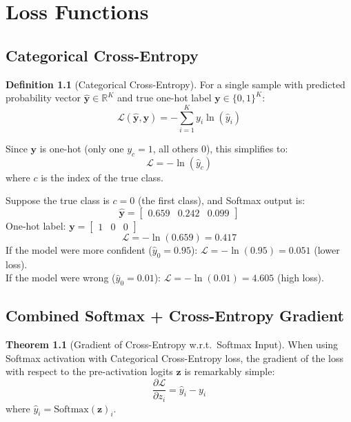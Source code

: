 \documentclass[12pt, a4paper]{report}
\theoremstyle{definition}
\newtheorem{definition}{Definition}[chapter]
\newtheorem{theorem}{Theorem}[chapter]
\begin{document}
\chapter{Loss Functions}

\section{Categorical Cross-Entropy}

\begin{definition}[Categorical Cross-Entropy]
For a single sample with predicted probability vector $\hat{\mathbf{y}} \in \mathbb{R}^K$ and true one-hot label $\mathbf{y} \in \{0,1\}^K$:
\begin{equation}
    \mathcal{L}(\hat{\mathbf{y}}, \mathbf{y}) = -\sum_{i=1}^{K} y_i \ln(\hat{y}_i)
\end{equation}

Since $\mathbf{y}$ is one-hot (only one $y_c = 1$, all others $0$), this simplifies to:
\begin{equation}
    \mathcal{L} = -\ln(\hat{y}_c)
\end{equation}
where $c$ is the index of the true class.
\end{definition}

\begin{numexample}
Suppose the true class is $c = 0$ (the first class), and Softmax output is:
\[
\hat{\mathbf{y}} = \begin{bmatrix} 0.659 & 0.242 & 0.099 \end{bmatrix}
\]
One-hot label: $\mathbf{y} = \begin{bmatrix} 1 & 0 & 0 \end{bmatrix}$
\[
\mathcal{L} = -\ln(0.659) = \boxed{0.417}
\]
If the model were more confident ($\hat{y}_0 = 0.95$): $\mathcal{L} = -\ln(0.95) = 0.051$ (lower loss).\\
If the model were wrong ($\hat{y}_0 = 0.01$): $\mathcal{L} = -\ln(0.01) = 4.605$ (high loss).
\end{numexample}

\section{Combined Softmax + Cross-Entropy Gradient}

\begin{theorem}[Gradient of Cross-Entropy w.r.t.\ Softmax Input]
When using Softmax activation with Categorical Cross-Entropy loss, the gradient of the loss with respect to the pre-activation logits $\mathbf{z}$ is remarkably simple:
\begin{equation}
    \frac{\partial \mathcal{L}}{\partial z_i} = \hat{y}_i - y_i
\end{equation}
where $\hat{y}_i = \text{Softmax}(\mathbf{z})_i$.
\end{theorem}
\end{document}
